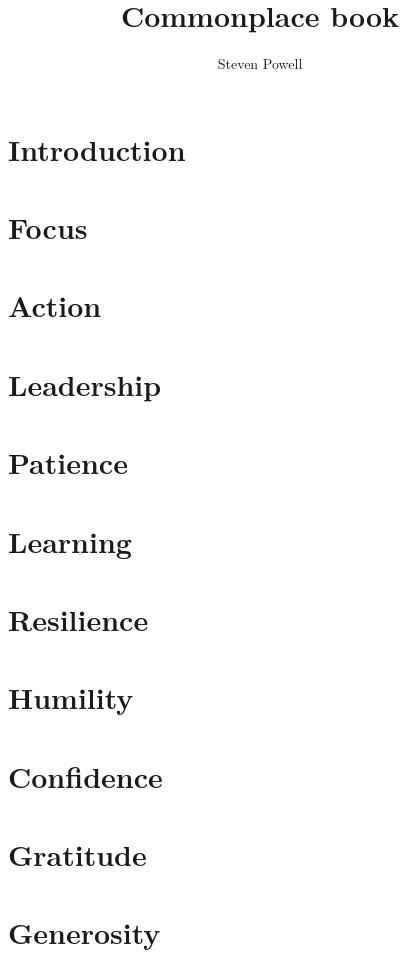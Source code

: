 \documentclass[a5paper]{book}
\title{Commonplace book}
\author{Steven Powell}
\begin{document}
\maketitle{}
\tableofcontents

\chapter{Introduction}


\chapter{Focus}


\chapter{Action}



\chapter{Leadership}



\chapter{Patience}



\chapter{Learning}



\chapter{Resilience}



\chapter{Humility}



\chapter{Confidence}



\chapter{Gratitude}



\chapter{Generosity}


\cleardoublepage
{}

\printindex
\end{document}
